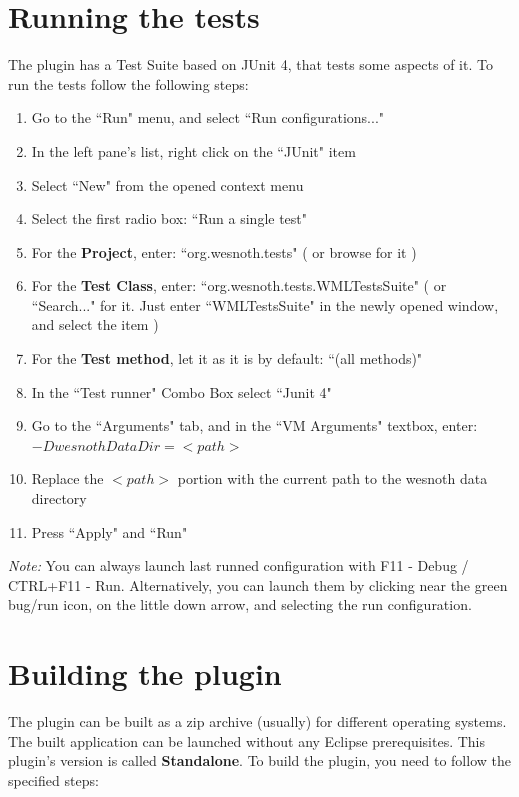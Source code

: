 \documentclass[10pt]{article}
\begin{document}
\section{Running the tests}
The plugin has a Test Suite based on JUnit 4, that tests some aspects of it. To run the tests follow the following steps:
\begin{enumerate}
	\item Go to the ``Run" menu, and select ``Run configurations..."
	\item In the left pane's list, right click on the ``JUnit" item
	\item Select ``New" from the opened context menu
	\item Select the first radio box: ``Run a single test"
	\item For the \textbf{Project}, enter: ``org.wesnoth.tests" ( or browse for it )
	\item For the \textbf{Test Class}, enter: ``org.wesnoth.tests.WMLTestsSuite" ( or ``Search..." for it. Just enter ``WMLTestsSuite" in the newly opened window, and select the item )
	\item For the \textbf{Test method}, let it as it is by default: ``(all methods)"
	\item In the ``Test runner" Combo Box select ``Junit 4"
	\item Go to the ``Arguments" tab, and in the ``VM Arguments" textbox, enter: $-DwesnothDataDir=<path>$
	\item Replace the $<path>$ portion with the current path to the wesnoth data directory
	\item Press ``Apply" and ``Run"
\end{enumerate}

\textit{Note:} You can always launch last runned configuration with F11 - Debug / CTRL+F11 - Run. Alternatively, you can launch them by clicking near the green bug/run icon, on the little down arrow, and selecting the run configuration.

\section{Building the plugin}
The plugin can be built as a zip archive (usually) for different operating systems. The built application can be launched without any Eclipse prerequisites. This plugin's version is called \textbf{Standalone}. To build the plugin, you need to follow the specified steps:
\end{document}
